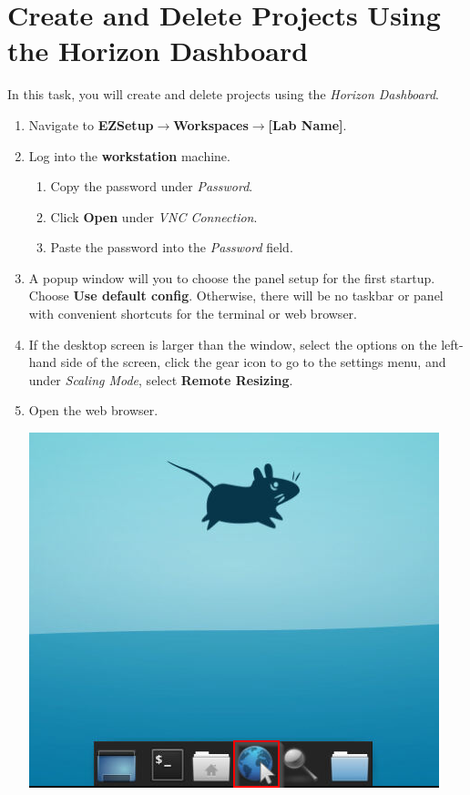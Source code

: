 \documentclass[letterpaper, 12pt]{article}
\begin{document}
\section{Create and Delete Projects Using the Horizon Dashboard}
\label{sec:create_and_delete_projects_using_the_horizon_dashboard}
In this task, you will create and delete projects using the \textit{Horizon Dashboard}.

\begin{enumerate}
    \item Navigate to \textbf{EZSetup$\rightarrow$Workspaces$\rightarrow$[Lab Name]}.
    
    \item Log into the \textbf{workstation} machine.
    \begin{enumerate}
        \item Copy the password under \textit{Password}.
        \item Click \textbf{Open} under \textit{VNC Connection}.
        \item Paste the password into the \textit{Password} field.
    \end{enumerate}

    \item A popup window will you to choose the panel setup for the first startup. Choose \textbf{Use default config}.
    Otherwise, there will be no taskbar or panel with convenient shortcuts for the terminal or web browser.

    \item If the desktop screen is larger than the window, select the options on the left-hand side of the screen,
    click the gear icon to go to the settings menu, and under \textit{Scaling Mode}, select \textbf{Remote Resizing}.

    \item Open the web browser.

    \begin{center}
    \includegraphics[scale=0.75]{images/part1/step5.png}
    \end{center}


\end{enumerate}
\end{document}
